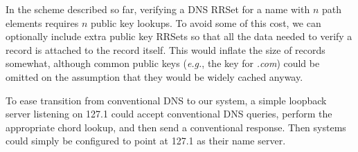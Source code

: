 In the scheme described so far, verifying a DNS RRSet for a name with $n$ 
path elements requires $n$ public key lookups.
To avoid some of this cost, we can optionally
include extra public key RRSets so that all the data needed to verify a record
is attached to the record itself.
This would inflate the size of records somewhat, although
common public keys ({\em e.g.}, the key for {\em .com}) could
be omitted on the assumption that they would be 
widely cached anyway.

To ease transition from conventional DNS to our system,
a simple loopback server listening on 127.1 could accept
conventional DNS queries, perform the appropriate chord lookup,
and then send a conventional response.
Then systems could simply be configured to 
point at 127.1 as their name server.

